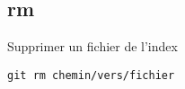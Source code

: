 \subsection*{rm}
Supprimer un fichier de l'index
\begin{verbatim}
git rm chemin/vers/fichier
\end{verbatim}

